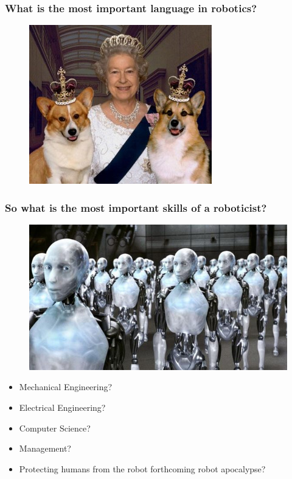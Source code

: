 \documentclass[compress]{beamer}
\begin{document}
\begin{frame}
   \frametitle{What is the most important language in robotics?}
   \begin{figure}
     \includegraphics[width=0.5\linewidth]{corgis.jpg}
   \end{figure}
 \end{frame}

\begin{frame}
  \frametitle{So what is the most important skills of a roboticist?}
  \begin{figure}
     \includegraphics[width=0.5\linewidth]{robot-army.jpg}
   \end{figure}
   \begin{itemize}
   \item Mechanical Engineering?
   \item Electrical Engineering?
   \item Computer Science?
   \item Management?
   \item Protecting humans from the robot forthcoming robot apocalypse?
   \end{itemize}
 \end{frame}
\end{document}

